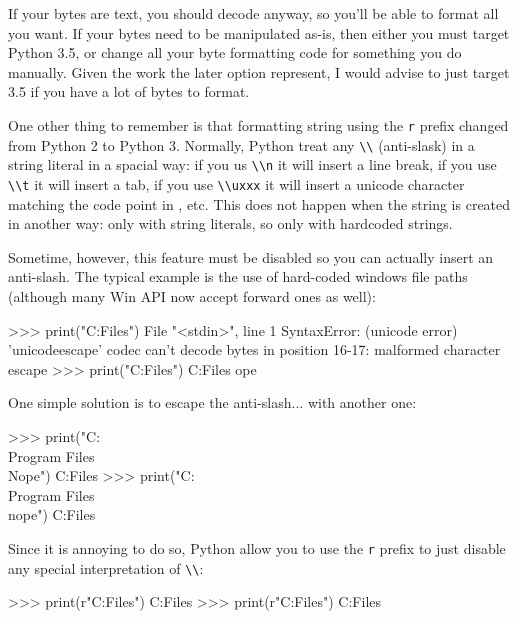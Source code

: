 \begin{py2}
\begin{py2}
\begin{py2}
\begin{py2}
If your bytes are text, you should decode anyway, so you'll be able to format all you want. If your bytes need to be manipulated as-is, then either you must target Python 3.5, or change all your byte formatting code for something you do manually. Given the work the later option represent, I would advise to just target 3.5 if you have a lot of bytes to format.

One other thing to remember is that formatting string using the \lstinline{r} prefix changed from Python 2 to Python 3. Normally, Python treat any \lstinline{\\} (anti-slask) in a string \gls{literal} in a spacial way: if you us \lstinline{\\n} it will insert a line break, if you use \lstinline{\\t} it will insert a tab, if you use  \lstinline{\\uxxx} it will insert a unicode character matching the code point in , etc. This does not happen when the string is created in another way: only with string literals, so only with hardcoded strings.

Sometime, however, this feature must be disabled so you can actually insert an anti-slash. The typical example is the use of hard-coded windows file paths (although many Win \gls{API} now accept forward ones as well):

\begin{py3}
>>> print("C:\Program Files\Nope")
File "<stdin>", line 1
SyntaxError: (unicode error) 'unicodeescape' codec can't decode bytes in position 16-17: malformed \N character escape
>>> print("C:\Program Files\nope")
C:\Program Files
ope
\end{py3}

One simple solution is to escape the anti-slash... with another one:

\begin{py3}
>>> print("C:\\Program Files\\Nope")
C:\Program Files\Nope
>>> print("C:\\Program Files\\nope")
C:\Program Files\nope
\end{py3}

Since it is annoying to do so, Python allow you to use the \lstinline{r} prefix to just disable any special interpretation of \lstinline{\\}:

\begin{py3}
>>> print(r"C:\Program Files\Nope")
C:\Program Files\Nope
>>> print(r"C:\Program Files\nope")
C:\Program Files\nope
\end{py3}


\end{py2}
\end{py2}
\end{py2}
\end{py2}
